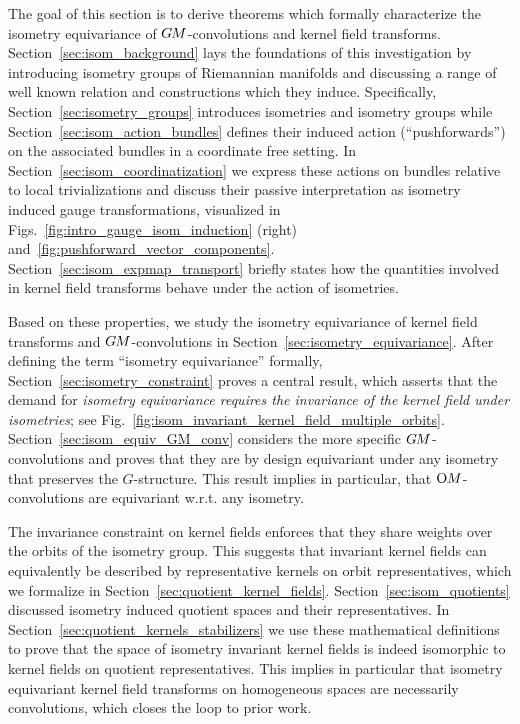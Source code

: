\etocsettocstyle{}{} %
\localtableofcontents


The goal of this section is to derive theorems which formally characterize the isometry equivariance of $G\mkern-1.4muM$-convolutions and kernel field transforms.
Section~\ref{sec:isom_background} lays the foundations of this investigation by introducing isometry groups of Riemannian manifolds and discussing a range of well known relation and constructions which they induce.
Specifically, Section~\ref{sec:isometry_groups} introduces isometries and isometry groups while Section~\ref{sec:isom_action_bundles} defines their induced action (``pushforwards'') on the associated bundles in a coordinate free setting.
In Section~\ref{sec:isom_coordinatization} we express these actions on bundles relative to local trivializations and discuss their passive interpretation as isometry induced gauge transformations, visualized in Figs.~\ref{fig:intro_gauge_isom_induction} (right) and~\ref{fig:pushforward_vector_components}.
Section~\ref{sec:isom_expmap_transport} briefly states how the quantities involved in kernel field transforms behave under the action of isometries.


Based on these properties, we study the isometry equivariance of kernel field transforms and $G\mkern-1.4muM$-convolutions in Section~\ref{sec:isometry_equivariance}.
After defining the term ``isometry equivariance'' formally, Section~\ref{sec:isometry_constraint} proves a central result, which asserts that the demand for \emph{isometry equivariance requires the invariance of the kernel field under isometries}; see Fig.~\ref{fig:isom_invariant_kernel_field_multiple_orbits}.
Section~\ref{sec:isom_equiv_GM_conv} considers the more specific $G\mkern-1.4muM$-convolutions and proves that they are by design equivariant under any isometry that preserves the $G$-structure.
This result implies in particular, that $\operatorname{O}\mkern-3.6muM$-convolutions are equivariant w.r.t. any isometry.


The invariance constraint on kernel fields enforces that they share weights over the orbits of the isometry group.
This suggests that invariant kernel fields can equivalently be described by representative kernels on orbit representatives, which we formalize in Section~\ref{sec:quotient_kernel_fields}.
Section~\ref{sec:isom_quotients} discussed isometry induced quotient spaces and their representatives.
In Section~\ref{sec:quotient_kernels_stabilizers} we use these mathematical definitions to prove that the space of isometry invariant kernel fields is indeed isomorphic to kernel fields on quotient representatives.
This implies in particular that isometry equivariant kernel field transforms on homogeneous spaces are necessarily convolutions, which closes the loop to prior work.
